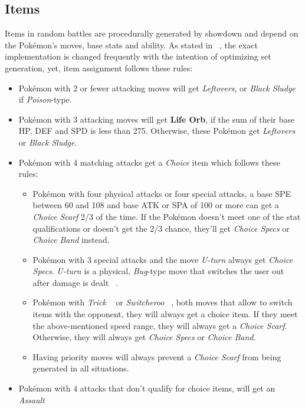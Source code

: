 \subsection{Items}
\label{sec:randbats-items}
Items in random battles are procedurally generated by showdown and depend on the Pokémon's
moves, base stats and ability. As stated in ~\autocite{Smogon:RandBatsGuide}, the exact implementation
is \grqq changed frequently with the intention of optimizing set generation\grqq, yet, item
assignment follows these rules:
\begin{itemize}
	\item Pokémon with 2 or fewer attacking moves will get \textit{Leftovers}, or 
	\textit{Black Sludge} if \textit{Poison}-type.
	\item Pokémon with 3 attacking moves will get \textbf{Life Orb}, if the sum of their base
	\ac{HP}, \ac{DEF} and \ac{SPD} is less than 275. Otherwise, these Pokémon get 
	\textit{Leftovers} or \textit{Black Sludge}.
	\item Pokémon with 4 matching attacks get a \textit{Choice} item which follows these rules:
	\begin{itemize}
		\item Pokémon with four physical attacks or four special attacks, a base \ac{SPE} between
		60 and 108 and base \ac{ATK} or \ac{SPA} of 100 or more can get a \textit{Choice Scarf}
		2/3 of the time. If the Pokémon doesn't meet one of the stat qualifications or doesn't
		get the 2/3 chance, they'll get \textit{Choice Specs} or \textit{Choice Band} instead.
		\item Pokémon with 3 special attacks and the move \textit{U-turn} always get 
		\textit{Choice Specs}. \textit{U-turn} is a physical, \textit{Bug}-type move that 
		switches the user out after damage is dealt ~\autocite{Bulbapedia:UTurn}.
		\item Pokémon with \textit{Trick} ~\autocite{Bulbapedia:Trick} or \textit{Switcheroo} 
		~\autocite{Bulbapedia:Switcheroo}, both moves that allow to switch items
		with the opponent, they will always get a choice item. If they meet the above-mentioned 
		speed range, they will always get a \textit{Choice Scarf}. Otherwise, they will always
		get \textit{Choice Specs} or \textit{Choice Band}.
		\item Having priority moves will always prevent a \textit{Choice Scarf} from being 
		generated in all situations.
	\end{itemize}
	\item Pokémon with 4 attacks that don't qualify for choice items, will get an \textit{Assault
}
\end{itemize}
